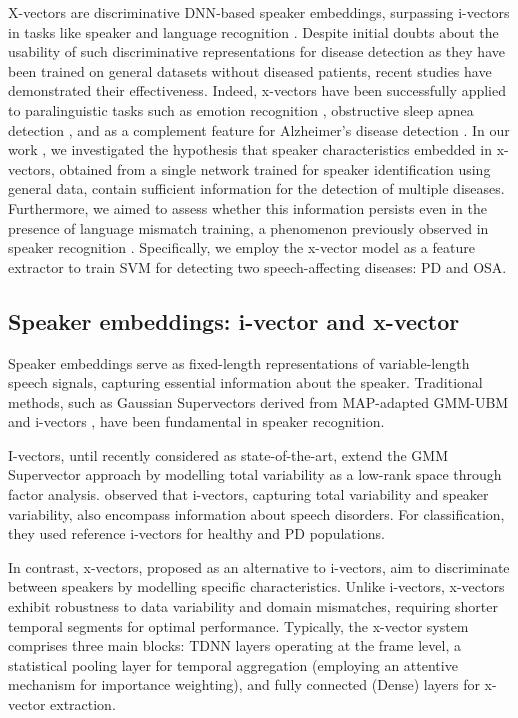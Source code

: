 X-vectors are discriminative \ac{DNN}-based speaker embeddings, surpassing i-vectors in tasks like speaker and language recognition \cite{snyder2018x}. Despite initial doubts about the usability of such discriminative representations for disease detection as they have been trained on general datasets without diseased patients, recent studies have demonstrated their effectiveness. Indeed, x-vectors have been successfully applied to paralinguistic tasks such as emotion recognition \cite{pappagari2020x}, obstructive sleep apnea detection \cite{perero2019modeling}, and as a complement feature for Alzheimer’s disease detection \cite{zargarbashi2019multi}. In our work \cite{botelho2020pathological}, we investigated the hypothesis that speaker characteristics embedded in x-vectors, obtained from a single network trained for speaker identification using general data, contain sufficient information for the detection of multiple diseases. Furthermore, we aimed to assess whether this information persists even in the presence of language mismatch training, a phenomenon previously observed in speaker recognition \cite{snyder2017deep}. Specifically, we employ the x-vector model as a feature extractor to train \ac{SVM} for detecting two speech-affecting diseases: \ac{PD} and  \ac{OSA}.

\subsection{Speaker embeddings: i-vector and x-vector}
Speaker embeddings serve as fixed-length representations of variable-length speech signals, capturing essential information about the speaker. Traditional methods, such as Gaussian Supervectors \cite{kenny2007joint} derived from \ac{MAP}-adapted \ac{GMM-UBM} \cite{reynolds2000speaker} and i-vectors \cite{dehak2010front}, have been fundamental in speaker recognition.

I-vectors, until recently considered as state-of-the-art, extend the \ac{GMM} Supervector approach by modelling total variability as a low-rank space through factor analysis. \cite{hauptman2019identifying} observed that i-vectors, capturing total variability and speaker variability, also encompass information about speech disorders. For classification, they used reference i-vectors for healthy and \ac{PD} populations.

In contrast, x-vectors, proposed as an alternative to i-vectors, aim to discriminate between speakers by modelling specific characteristics. Unlike i-vectors, x-vectors exhibit robustness to data variability and domain mismatches, requiring shorter temporal segments for optimal performance. Typically, the x-vector system comprises three main blocks: \ac{TDNN} layers operating at the frame level, a statistical pooling layer for temporal aggregation (employing an attentive mechanism for importance weighting), and fully connected (Dense) layers for x-vector extraction.

